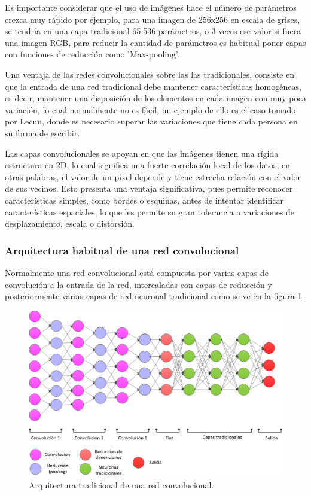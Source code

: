         Es importante considerar que el uso de imágenes hace el número de parámetros crezca muy rápido por ejemplo, para una imagen de 256x256 en escala de grises, se tendría en una capa tradicional 65.536 parámetros, o 3 veces ese valor si fuera una imagen RGB, para reducir la cantidad de parámetros es habitual poner capas con funciones de reducción como 'Max-pooling'. 
        
        Una ventaja de las redes convolucionales sobre las las tradicionales, consiste en que la entrada de una red tradicional debe mantener características homogéneas, es decir, mantener una disposición de los elementos en cada imagen con muy poca variación, lo cual normalmente no es fácil, un ejemplo de ello es el caso tomado por Lecun, donde es necesario superar las variaciones que tiene cada persona en su forma de escribir. 

        Las capas convolucionales se apoyan en que las imágenes tienen una rígida estructura en 2D, lo cual significa una fuerte correlación local de los datos, en otras palabras, el valor de un píxel depende y tiene estrecha relación con el valor de sus vecinos. Esto presenta una ventaja significativa, pues permite reconocer características simples, como bordes o esquinas, antes de intentar identificar características espaciales, lo que les permite su gran tolerancia a variaciones de desplazamiento, escala o distorsión.

        \subsubsection{Arquitectura habitual de una red convolucional}
            Normalmente una red convolucional está compuesta por varias capas de convolución a la entrada de la red, intercaladas con capas de reducción y posteriormente varias capas de red neuronal tradicional como se ve en la figura \ref{fig:ConvolutionArchitecture}.

            \begin{figure}[ht!]
            	\centering
            	\includegraphics[width=0.8\linewidth]{imgs/02-Referential/02-arch-cnn2.png}
            	\caption[Arquitectura tradicional de una red convolucional.]{Arquitectura tradicional de una red convolucional. }
        	    \label{fig:ConvolutionArchitecture}
            \end{figure}%
        
